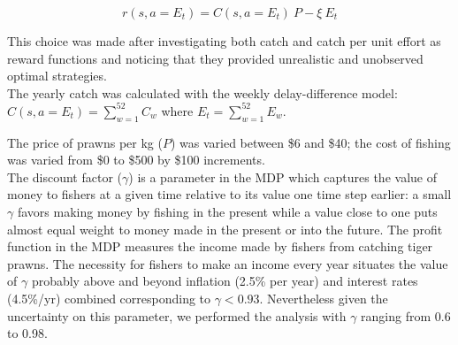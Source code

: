 \begin{equation}
r(s,a=E_{t}) = C(s,a=E_{t}) \ P - \xi \ E_{t}
\end{equation}

This choice was made after investigating both catch and catch per unit effort as reward functions and noticing that they provided unrealistic and unobserved optimal strategies. \\
The yearly catch was calculated with the weekly delay-difference model: $C(s,a=E_{t})=\sum_{w=1}^{52} \hat{C}_{w} $ where $E_{t} = \sum_{w=1}^{52} E_{w}$. 

The price of prawns per kg ($P$) was varied between \$6 and \$40; the cost of fishing was varied from \$0 to \$500 by \$100 increments.\\

The discount factor ($\gamma$) is a parameter in the MDP which captures the value of money to fishers at a given time relative to its value one time step earlier: a small $\gamma$ favors making money by fishing in the present while a value close to one puts almost equal weight to money made in the present or into the future. The profit function in the MDP measures the income made by fishers from catching tiger prawns. The necessity for fishers to make an income every year situates the value of $\gamma$ probably above and beyond inflation (2.5\% per year) and interest rates (4.5\%/yr) combined corresponding to $\gamma < 0.93$. Nevertheless given the uncertainty on this parameter, we performed the analysis with $\gamma$ ranging from 0.6 to 0.98. 